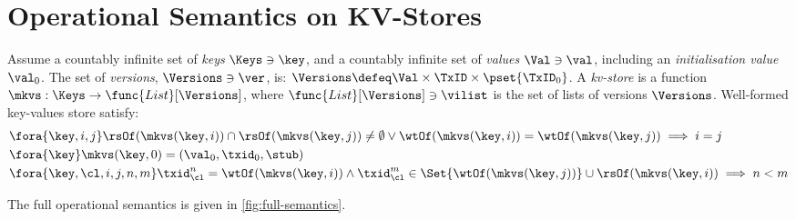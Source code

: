 \section{Operational Semantics on KV-Stores}
\label{sec:full-semantics}

\begin{definition}
\label{def:mkvs-appendix}
Assume a countably infinite set of \emph{keys} $\Keys \ni \key$, 
and a countably infinite set of  \emph{values} $\Val \ni \val$, 
including an \emph{initialisation value} $\val_0 $.
The set of \emph{versions}, $\Versions \ni \ver$, is: $\Versions \defeq \Val \times \TxID \times \pset{\TxID_{0}}$. 
A \emph{kv-store} is a function $\mkvs: \Keys \to \func{List}[\Versions]$, 
where $\func{List}[\Versions] \ni \vilist$ is the set of lists of versions $\Versions$. 
Well-formed key-values store satisfy:
\begin{align}
& \fora{\key, i, j} 
\rsOf(\mkvs(\key, i)) \cap \rsOf(\mkvs(\key, j)) \neq \emptyset \lor
\wtOf(\mkvs(\key, i)) = \wtOf(\mkvs(\key, j))
\implies i = j  \\
& \fora{\key} \mkvs(\key, 0) = (\val_0, \txid_0, \stub) \\
& \fora{ \key, \cl, i,j, n, m} 
\txid_{\cl}^{n} = \wtOf(\mkvs(\key,i)) \land \txid_{\cl}^{m} \in
\Set{\wtOf(\mkvs(\key,j))} \cup \rsOf(\mkvs(\key, i)) \implies n < m
\end{align}
\end{definition}

The full operational semantics is given in \cref{fig:full-semantics}.


\newpage

